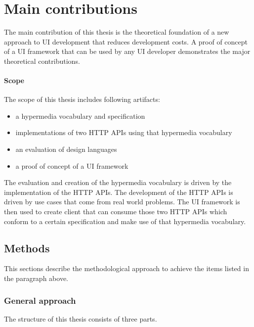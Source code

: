 \section{Main contributions}\label{contributions}
The main contribution of this thesis is the theoretical foundation of a new approach to UI development that reduces development costs. A proof of concept of a UI framework that can be used by any UI developer demonstrates the major theoretical contributions.

\paragraph{Scope}
The scope of this thesis includes following artifacts:
\begin{itemize}
\item a hypermedia vocabulary and specification
\item implementations of two HTTP APIs using that hypermedia vocabulary
\item an evaluation of design languages
\item a proof of concept of a UI framework
\end{itemize}
The evaluation and creation of the hypermedia vocabulary is driven by the implementation of the HTTP APIs. The development of the HTTP APIs is driven by use cases that come from real world problems. The UI framework is then used to create client that can consume those two HTTP APIs which conform to a certain specification and make use of that hypermedia vocabulary.

\subsection{Methods}
This sections describe the methodological approach to achieve the items listed in the paragraph above.

\subsubsection{General approach}
The structure of this thesis consists of three parts.

